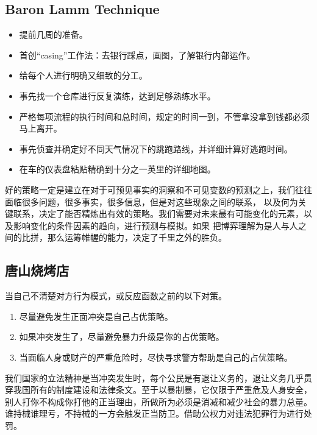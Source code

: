 \documentclass[12pt, a4paper]{article} %
\begin{document}
\begin{CJK*}{UTF8}{gbsn}
        \subsection{Baron Lamm Technique}
        \begin{itemize}
            \item 提前几周的准备。
            \item 首创“casing”工作法：去银行踩点，画图，了解银行内部运作。
            \item 给每个人进行明确又细致的分工。
            \item 事先找一个仓库进行反复演练，达到足够熟练水平。
            \item 严格每项流程的执行时间和总时间，规定的时间一到，不管拿没拿到钱都必须马上离开。
            \item 事先侦查并确定好不同天气情况下的跳跑路线，并详细计算好逃跑时间。
            \item 在车的仪表盘粘贴精确到十分之一英里的详细地图。
        \end{itemize}
        好的策略一定是建立在对于可预见事实的洞察和不可见变数的预测之上，我们往往面临很多问题，很多事实，很多信息，但是对这些现象之间的联系，
        以及何为关键联系，决定了能否精炼出有效的策略。我们需要对未来最有可能变化的元素，以及影响变化的条件因素的趋向，进行预测与模拟。如果
        把博弈理解为是人与人之间的比拼，那么运筹帷幄的能力，决定了千里之外的胜负。

        \subsection{唐山烧烤店}
        当自己不清楚对方行为模式，或反应函数之前的以下对策。

        \begin{enumerate}
            \item 尽量避免发生正面冲突是自己占优策略。
            \item 如果冲突发生了，尽量避免暴力升级是你的占优策略。
            \item 当面临人身或财产的严重危险时，尽快寻求警方帮助是自己的占优策略。
        \end{enumerate}

        我们国家的立法精神是当冲突发生时，每个公民是有退让义务的，退让义务几乎贯穿我国所有的制度建设和法律条文。至于以暴制暴，它仅限于严重危及人身安全，
        别人打你不构成你打他的正当理由，所做所为必须是消减和减少社会的暴力总量。谁持械谁理亏，不持械的一方会触发正当防卫。借助公权力对违法犯罪行为进行处罚。\par


\end{CJK*}
\end{document}
